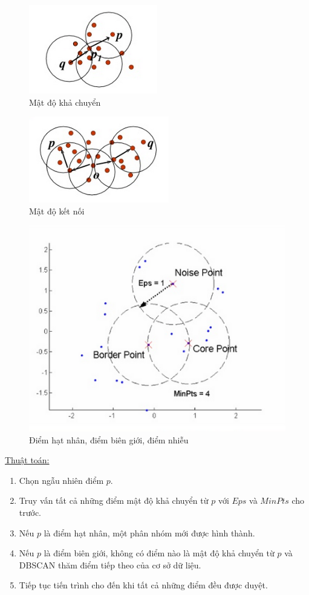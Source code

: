 \begin{figure}[htp]
\centering
\includegraphics{Images/Density_02}
\caption{Mật độ khả chuyển}
\label{fig:Density_02}
\end{figure}

\begin{figure}[htp]
\centering
\includegraphics{Images/Density_03}
\caption{Mật độ kết nối}
\label{fig:Density_03}
\end{figure}

\begin{figure}[htp]
\centering
\includegraphics{Images/Density_04}
\caption{Điểm hạt nhân, điểm biên giới, điểm nhiễu}
\label{fig:Density_04}
\end{figure}

\clearpage
\underline{Thuật toán:}
\begin{enumerate}
\item[]Chọn ngẫu nhiên điểm $p$.
\item[]Truy vấn tất cả những điểm mật độ khả chuyển từ $p$ với $Eps$ và $MinPts$ cho trước.
\item[]Nếu $p$ là điểm hạt nhân, một phân nhóm mới được hình thành.
\item[]Nếu $p$ là điểm biên giới, không có điểm nào là mật độ khả chuyển từ $p$ và DBSCAN thăm điểm tiếp theo của cơ sở dữ liệu.
\item[]Tiếp tục tiến trình cho đến khi tất cả những điểm đều được duyệt.
\end{enumerate}

